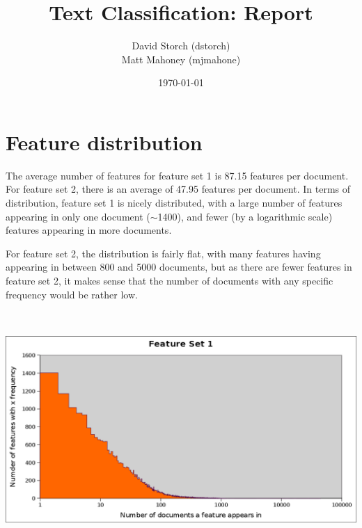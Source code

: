 \documentclass[11pt]{article}
\title{Text Classification: Report}
\author{David Storch (dstorch) \\ Matt Mahoney (mjmahone)}
\date{\today}
\begin{document}
\maketitle

\section{Feature distribution}

The average number of features for feature set 1 is 87.15 features per 
document. For feature set 2, there is an average of 47.95 features per 
document. In terms of distribution, feature set 1 is nicely distributed, 
with a large number of features appearing in only one document ($\sim$1400),
and fewer (by a logarithmic scale) features appearing in more documents.

For feature set 2, the distribution is fairly flat, with many features 
having appearing in 
between 800 and 5000 documents, but as there are
fewer features in feature set 2, it makes sense that the number of documents
with any specific frequency would be rather low.

\begin{center}
\end{center}

\begin{center}
 \includegraphics[width=15cm, height=9cm]{../set1.png}
\end{center}
\end{document}

